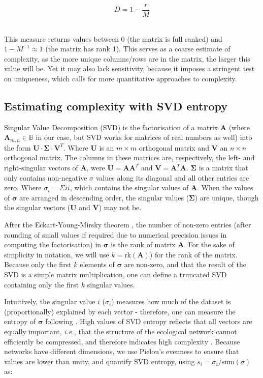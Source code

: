\[D = 1-\frac{r}{M}\]\

This measure returns values between 0 (the matrix is full ranked) and \(1-M^{-1}
\approx 1\) (the matrix has rank 1). This serves as a coarse estimate of
complexity, as the more unique columns/rows are in the matrix, the larger this
value will be. Yet it may also lack sensitivity, because it imposes a stringent
test on uniqueness, which calls for more quantitative approaches to complexity.

\subsection{Estimating complexity with SVD
entropy}\label{estimating-complexity-with-svd-entropy}

Singular Value Decomposition (SVD) is the factorisation of a matrix
\(\mathbf{A}\) (where \(\mathbf{A}_{m,n} \in\mathbb{B}\) in our case, but SVD
works for matrices of real numbers as well) into the form
\(\mathbf{U}\cdot\mathbf{\Sigma}\cdot \mathbf{V}^T\). Where \(\mathbf{U}\) is an
\(m \times m\) orthogonal matrix and \(\mathbf{V}\) an \(n \times n\) orthogonal
matrix. The columns in these matrices are, respectively, the left- and
right-singular vectors of \(\mathbf{A}\), were \(\mathbf{U} =
\mathbf{A}\mathbf{A}^T\) and \(\mathbf{V} = \mathbf{A}^T\mathbf{A}\).
\(\mathbf{\Sigma}\) is a matrix that only contains non-negative \(\sigma\)
values along its diagonal and all other entries are zero. Where \(\sigma_{i} =
\Sigma{ii}\), which contains the singular values of \(\mathbf{A}\). When the
values of \(\mathbf{\sigma}\) are arranged in descending order, the singular
values (\(\mathbf{\Sigma}\)) are unique, though the singular vectors
(\(\mathbf{U}\) and \(\mathbf{V}\)) may not be.

After the Eckart-Young-Mirsky theorem \cite{Eckart1936AppOne, Golub1987GenEck},
the number of non-zero entries (after rounding of small values if required due
to numerical precision issues in computing the factorisation) in
\(\mathbf{\sigma}\) is the rank of matrix \(\mathbf{A}\). For the sake of
simplicity in notation, we will use \(k = \text{rk}(\mathbf{A})\)) for the rank
of the matrix. Because only the first \(k\) elements of \(\mathbf{\sigma}\) are
non-zero, and that the result of the SVD is a simple matrix multiplication, one
can define a truncated SVD containing only the first \(k\) singular values.

Intuitively, the singular value \(i\) (\(\sigma_i\)) measures how much of the
dataset is (proportionally) explained by each vector - therefore, one can
measure the entropy of \(\mathbf{\sigma}\) following \cite{Shannon1948MatThe}. High
values of SVD entropy reflects that all vectors are equally important,
\emph{i.e.,} that the structure of the ecological network cannot efficiently be
compressed, and therefore indicates high complexity \cite{Gu2016HowLon}. Because
networks have different dimensions, we use Pielou's evenness
\cite{Pielou1975EcoDiv} to ensure that values are lower than unity, and quantify
SVD entropy, using \(s_i = \sigma_i/\text{sum}(\sigma)\) as:

